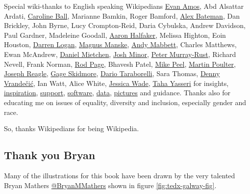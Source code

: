 \documentclass[
]{book}
\begin{document}
Special wiki-thanks to English speaking Wikipedians \href{https://en.wikipedia.org/wiki/Evan_Amos}{Evan Amos}, Abd Alsattar Ardati, \href{https://www.timeshighereducation.com/news/teaching-intelligence-putting-wikipedia-heart-class}{Caroline Ball}, Marianne Bamkin, Roger Bamford, \href{https://en.wikipedia.org/wiki/Alex_Bateman}{Alex Bateman}, Dan Brickley, John Byrne, Lucy Crompton-Reid, Daria Cybulska, Andrew Davidson, Paul Gardner, Madeleine Goodall, \href{https://en.wikipedia.org/wiki/Aaron_Halfaker}{Aaron Halfaker}, Melissa Highton, Eoin Houston, \href{https://royalsociety.org/topics-policy/projects/research-culture/changing-expectations/dr-darren-logan/}{Darren Logan}, \href{https://en.wikipedia.org/wiki/Magnus_Manske}{Magnus Manske}, \href{https://commons.wikimedia.org/wiki/User:Pigsonthewing}{Andy Mabbett}, Charles Matthews, Ewan McAndrew, \href{https://github.com/Daniel-Mietchen}{Daniel Mietchen}, \href{https://wikimediafoundation.org/profile/josh-minor/}{Josh Minor}, \href{https://en.wikipedia.org/wiki/Peter_Murray-Rust}{Peter Murray-Rust}, Richard Nevell, Frank Norman, \href{https://en.wikipedia.org/wiki/Roderic_D._M._Page}{Rod Page}, Bhavesh Patel, \href{https://www.mikepeel.net/}{Mike Peel}, \href{http://infobomb.org/}{Martin Poulter}, \href{https://en.wikipedia.org/wiki/Joseph_M._Reagle_Jr.}{Joseph Reagle}, \href{https://en.wikipedia.org/wiki/Gage_Skidmore}{Gage Skidmore}, \href{https://nitens.org/w/}{Dario Taraborelli}, Sara Thomas, \href{https://en.wikipedia.org/wiki/Denny_Vrande\%C4\%8Di\%C4\%87}{Denny Vrandečić}, Ian Watt, Alice White, \href{https://en.wikipedia.org/wiki/Jess_Wade}{Jessica Wade}, \href{https://en.wikipedia.org/wiki/Taha_Yasseri}{Taha Yasseri} for insights, \href{https://duncan.hull.name/2019/12/10/glasgow/}{inspiration}, \href{https://wiki-loves-scientists.org.uk/2020/05/21/wiki1000/}{support}, \href{https://apps.apple.com/us/app/wikipedia/id324715238}{software}, \href{https://www.wikidata.org/}{data}, \href{https://commons.wikimedia.org/}{pictures} and guidance. Thanks also for educating me on issues of equality, diversity and inclusion, especially gender and race.

So, thanks Wikipedians for being Wikipedia. 🙏

\hypertarget{visualthinkery}{%
\subsection{Thank you Bryan}\label{visualthinkery}}

Many of the illustrations for this book have been drawn by the very talented Bryan Mathers \href{https://twitter.com/BryanMMathers/}{@BryanMMathers} shown in figure \ref{fig:tedx-galway-fig}.
\end{document}
